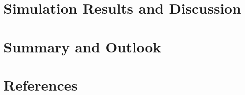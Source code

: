 \documentclass[11pt]{article}
\begin{document}
\begin{figure}[h!]
%
%
\end{figure}
 



\section{Simulation Results and Discussion}

\section{Summary and Outlook}

\section{References}
\end{document}
